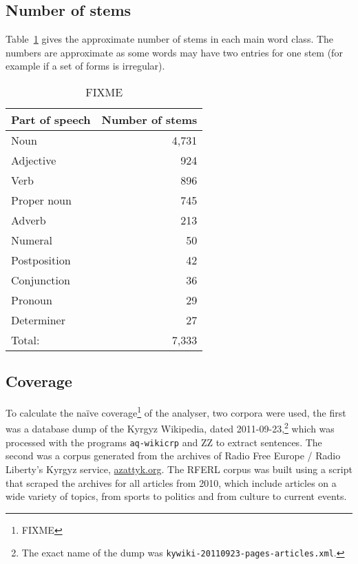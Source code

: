 \documentclass[a4paper,12pt,onecolumn,oneside]{article}
\begin{document}
\subsection{Number of stems}

Table~\ref{table:stems} gives the approximate number of stems in each main word class. The numbers
are approximate as some words may have two entries for one stem (for example if a set of forms
is irregular).

\begin{table}
	\centering
	\begin{tabular}{lr}
		\toprule
		Part of speech & Number of stems\\
		\midrule
		Noun & 4,731\\
		Adjective & 924\\
		Verb & 896 \\
		Proper noun & 745\\
		Adverb & 213\\
		Numeral & 50\\
		Postposition & 42\\
		Conjunction & 36\\
		Pronoun & 29\\
		Determiner & 27\\
		\midrule
		Total:     & 7,333\\
		\bottomrule
	\end{tabular}
	\caption{FIXME}\label{table:stems}
\end{table}


\subsection{Coverage}

To calculate the naïve coverage\footnote{FIXME} of the analyser, two corpora were used, the first was a database dump of the Kyrgyz Wikipedia, dated 2011-09-23,\footnote{The exact name of the dump was \texttt{kywiki-20110923-pages-articles.xml}.} which was processed with the programs \texttt{aq-wikicrp} and ZZ to extract sentences. The second was a corpus generated from the archives of Radio Free Europe / Radio Liberty's Kyrgyz service, \href{http://www.azattyk.org}{azattyk.org}.  The RFERL corpus was built using a script that scraped the archives for all articles from 2010, which include articles on a wide variety of topics, from sports to politics and from culture to current events.
\end{document}
